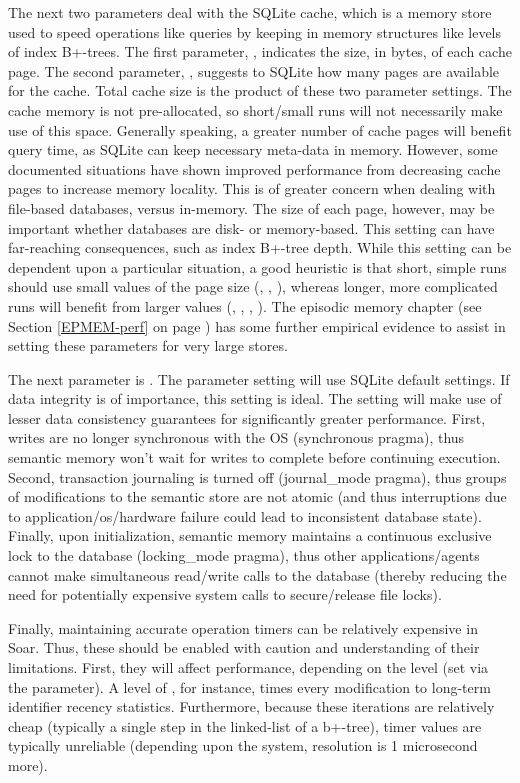 The next two parameters deal with the SQLite cache, which is a memory store used to speed operations like queries by keeping in memory structures like levels of index B+-trees. The first parameter, , indicates the size, in bytes, of each cache page. The second parameter, , suggests to SQLite how many pages are available for the cache. Total cache size is the product of these two parameter settings. The cache memory is not pre-allocated, so short/small runs will not necessarily make use of this space. Generally speaking, a greater number of cache pages will benefit query time, as SQLite can keep necessary meta-data in memory. However, some documented situations have shown improved performance from decreasing cache pages to increase memory locality. This is of greater concern when dealing with file-based databases, versus in-memory. The size of each page, however, may be important whether databases are disk- or memory-based. This setting can have far-reaching consequences, such as index B+-tree depth. While this setting can be dependent upon a particular situation, a good heuristic is that short, simple runs should use small values of the page size (, , ), whereas longer, more complicated runs will benefit from larger values (, , , ). The episodic memory chapter (see Section \ref{EPMEM-perf} on page \pageref{EPMEM-perf}) has some further empirical evidence to assist in setting these parameters for very large stores.

The next parameter is .  The  parameter setting will use SQLite default settings.  If data integrity is of importance, this setting is ideal.  The  setting will make use of lesser data consistency guarantees for significantly greater performance.  First, writes are no longer synchronous with the OS (synchronous pragma), thus semantic memory won't wait for writes to complete before continuing execution.  Second, transaction journaling is turned off (journal\_mode pragma), thus groups of modifications to the semantic store are not atomic (and thus interruptions due to application/os/hardware failure could lead to inconsistent database state).  Finally, upon initialization, semantic memory maintains a continuous exclusive lock to the database (locking\_mode pragma), thus other applications/agents cannot make simultaneous read/write calls to the database (thereby reducing the need for potentially expensive system calls to secure/release file locks).

Finally, maintaining accurate operation timers can be relatively expensive in Soar.  Thus, these should be enabled with caution and understanding of their limitations.  First, they will affect performance, depending on the level (set via the  parameter).  A level of , for instance, times every modification to long-term identifier recency statistics.  Furthermore, because these iterations are relatively cheap (typically a single step in the linked-list of a b+-tree), timer values are typically unreliable (depending upon the system, resolution is 1 microsecond more).
